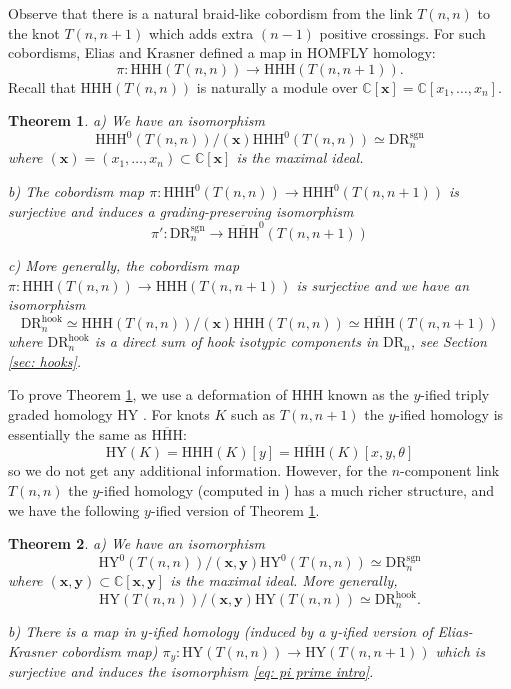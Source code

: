 \documentclass{amsart}
\newcommand{\C}{\mathbb{C}}
\newcommand{\xx}{\mathbf{x}}
\newcommand{\yy}{\mathbf{y}}
\newcommand{\DR}{\mathrm{DR}}
\newcommand{\HY}{\mathrm{HY}}
\newcommand{\sgn}{\mathrm{sgn}}
\newcommand{\HHH}{\mathrm{HHH}}
\newcommand{\hook}{\mathrm{hook}}
\numberwithin{equation}{section}
\newtheorem{theorem}{Theorem}[section]
\theoremstyle{definition}
\begin{document}
Observe that there is a natural braid-like cobordism from the link $T(n,n)$ to the knot $T(n,n+1)$ which adds extra $(n-1)$ positive crossings. For such cobordisms, Elias and Krasner \cite{EK} defined a   map in HOMFLY homology:
$$
\pi: \HHH(T(n,n))\to \HHH(T(n,n+1)).
$$
Recall that $\HHH(T(n,n))$ is naturally a module over $\C[\xx]=\C[x_1,\ldots,x_n]$.

\begin{theorem}
\label{thm: main iso}
a) We have an isomorphism
$$
\HHH^0(T(n,n))/(\xx)\HHH^0(T(n,n))\simeq \DR_n^{\sgn}
$$
where $(\xx)=(x_1,\ldots,x_n)\subset \C[\xx]$ is the maximal ideal.

b) The cobordism map $\pi: \HHH^0(T(n,n))\to \HHH^0(T(n,n+1))$ is surjective and induces a
 grading-preserving isomorphism
\begin{equation}
\label{eq: pi prime intro}
\pi':\DR_n^{\sgn}\to \overline{\HHH}^0(T(n,n+1))
\end{equation}

c) More generally, the cobordism map $\pi: \HHH(T(n,n))\to \HHH(T(n,n+1))$ is surjective and we have an isomorphism
$$
\DR_n^{\hook}\simeq \HHH(T(n,n))/(\xx)\HHH(T(n,n))\simeq \overline{\HHH}(T(n,n+1))
$$
where $\DR_n^{\hook}$ is a direct sum of hook isotypic components in $\DR_n$, see Section \ref{sec: hooks}.
\end{theorem}

 

To prove Theorem \ref{thm: main iso}, we use a deformation of $\HHH$ known as the $y$-ified triply graded homology $\HY$ \cite{GH}. For knots $K$ such as $T(n,n+1)$ the $y$-ified homology is essentially the same as $\overline{\HHH}$:
\begin{equation}
\label{eq: knots intro}
\HY(K)=\HHH(K)[y]=\overline{\HHH}(K)[x,y,\theta]
\end{equation}
so we do not get any additional information. However, for the $n$-component link $T(n,n)$ the $y$-ified homology (computed in \cite{GH}) has a much richer structure, and we have the following $y$-ified version of Theorem \ref{thm: main iso}.

\begin{theorem}
\label{thm: main iso y}
a) We have an isomorphism
$$
\HY^0(T(n,n))/(\xx,\yy)\HY^0(T(n,n))\simeq \DR_n^{\sgn}
$$
where $(\xx,\yy) \subset \C[\xx,\yy]$ is the maximal ideal. More generally,
$$
\HY(T(n,n))/(\xx,\yy)\HY(T(n,n))\simeq \DR_n^{\hook}.
$$

b) There is  a map in $y$-ified homology (induced by a $y$-ified version of Elias-Krasner cobordism map) $\pi_y: \HY(T(n,n))\to \HY(T(n,n+1))$ which is surjective and induces the isomorphism \eqref{eq: pi prime intro}. 
\end{theorem} 
\end{document}
